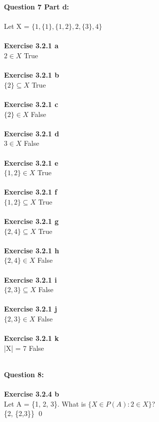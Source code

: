 \documentclass[11pt]{article}
\begin{document}
\noindent \textbf{Question 7 Part d:}\\\\
Let X = $\{1, \{1\}, \{1,2\}, 2, \{3\}, 4 \}$\\\\
\textbf{Exercise 3.2.1 a }\\	
$2 \in X$ True\\\\
\textbf{Exercise 3.2.1 b }\\	
$\{2\} \subseteq X$ True\\\\
\textbf{Exercise 3.2.1 c }\\	
$\{2\} \in X$ False\\\\
\textbf{Exercise 3.2.1 d }\\	
$3 \in X$ False\\\\
\textbf{Exercise 3.2.1 e }\\	
$\{1, 2\} \in X$ True\\\\
\textbf{Exercise 3.2.1 f }\\	
$\{1, 2\} \subseteq X$ True\\\\
\textbf{Exercise 3.2.1 g }\\	
$\{2, 4\} \subseteq X$ True\\\\
\textbf{Exercise 3.2.1 h }\\	
$\{2, 4\} \in X$ False\\\\
\textbf{Exercise 3.2.1 i }\\	
$\{2, 3\} \subseteq X$ False\\\\
\textbf{Exercise 3.2.1 j }\\
$\{2, 3\} \in X$ False\\\\	
\textbf{Exercise 3.2.1 k }\\	
|X| = 7 False\\\\

\newpage

\noindent \textbf{Question 8:}\\\\
\textbf{Exercise 3.2.4 b }\\	
Let A = \{1, 2, 3\}. What is $\{X \in P(A): 2 \in X\}$?\\
\{2, \{2,3\}\} \qed
\newpage
\end{document}
